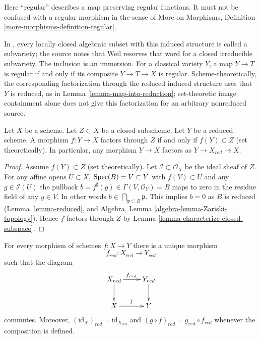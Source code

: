 \begin{remark}
Here ``regular'' describes a map preserving regular functions. It must not
be confused with a regular morphism in the sense of
More on Morphisms, Definition \ref{more-morphisms-definition-regular}.

In \cite{FAC}, every locally closed algebraic subset with this induced
structure is called a subvariety; the source notes that Weil reserves that
word for a closed irreducible subvariety. The inclusion is an immersion.
For a classical variety $Y$, a map $Y \to T$ is regular if and only if its
composite $Y \to T \to X$ is regular. Scheme-theoretically, the corresponding
factorization through the reduced induced structure uses that $Y$ is reduced,
as in Lemma \ref{lemma-map-into-reduction}; set-theoretic image containment
alone does not give this factorization for an arbitrary nonreduced source.
\end{remark}

\begin{lemma}
\label{lemma-map-into-reduction}
Let $X$ be a scheme.
Let $Z \subset X$ be a closed subscheme.
Let $Y$ be a reduced scheme.
A morphism $f : Y \to X$ factors through $Z$ if and only if
$f(Y) \subset Z$ (set theoretically). In particular, any
morphism $Y \to X$ factors as $Y \to X_{red} \to X$.
\end{lemma}

\begin{proof}
Assume $f(Y) \subset Z$ (set theoretically).
Let $\mathcal{I} \subset \mathcal{O}_X$ be the ideal sheaf of $Z$.
For any affine opens $U \subset X$, $\mathop{\mathrm{Spec}}(B) = V \subset Y$
with $f(V) \subset U$ and any $g \in \mathcal{I}(U)$
the pullback $b = f^\sharp(g) \in \Gamma(V, \mathcal{O}_Y) = B$
maps to zero in the residue field of any $y \in V$.
In other words $b \in \bigcap_{\mathfrak p \subset B} \mathfrak p$.
This implies $b = 0$ as $B$ is reduced (Lemma \ref{lemma-reduced}, and
Algebra, Lemma \ref{algebra-lemma-Zariski-topology}).
Hence $f$ factors through
$Z$ by Lemma \ref{lemma-characterize-closed-subspace}.
\end{proof}

\begin{lemma}
\label{lemma-reduction-functorial}
\begin{reference}
\cite[(5.1.5)]{EGA1}
\end{reference}
For every morphism of schemes $f : X \to Y$ there is a unique morphism
$$
f_{red} : X_{red} \longrightarrow Y_{red}
$$
such that the diagram
$$
\xymatrix{
X_{red} \ar[r]^{f_{red}} \ar[d] & Y_{red} \ar[d] \\
X \ar[r]^f & Y
}
$$
commutes. Moreover, $(\text{id}_X)_{red} = \text{id}_{X_{red}}$ and
$(g \circ f)_{red} = g_{red} \circ f_{red}$ whenever the composition is
defined.
\end{lemma}

